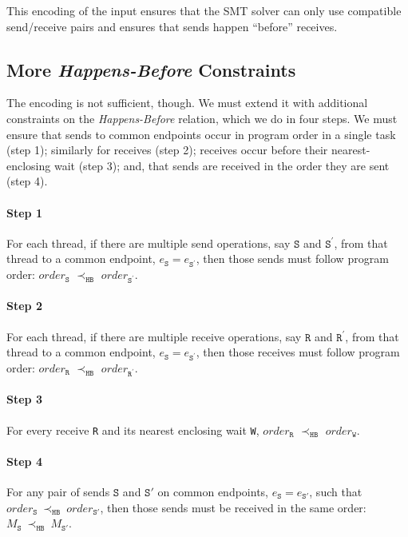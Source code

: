 This encoding of the input ensures that the SMT solver can only use
compatible send/receive pairs and ensures that sends happen ``before''
receives.

\subsection{More \emph{Happens-Before} Constraints}

The encoding is not sufficient, though. We must extend it with
additional constraints on the \emph{Happens-Before} relation, which we
do in four steps. We must ensure that sends to common endpoints occur
in program order in a single task (step 1); similarly for receives
(step 2); receives occur before their nearest-enclosing wait (step 3);
and, that sends are received in the order they are sent (step 4).

\paragraph*{Step 1} For each thread, if there are multiple send
operations, say $\mathtt{S}$ and $\mathtt{S^\prime}$, from that thread
to a common endpoint, $e_\mathtt{S} = e_\mathtt{S^\prime}$, then those
sends must follow program order: $\mathit{order}_\mathtt{S}$
$\prec_\mathtt{HB}$ $\mathit{order}_\mathtt{S^\prime}$.

\paragraph*{Step 2} For each thread, if there are multiple receive
operations, say $\mathtt{R}$ and $\mathtt{R^\prime}$, from that thread
to a common endpoint, $e_\mathtt{S} = e_\mathtt{S^\prime}$, then those
receives must follow program order: $\mathit{order}_\mathtt{R}$
$\prec_\mathtt{HB}$ $\mathit{order}_\mathtt{R^\prime}$.

\paragraph*{Step 3} For every receive \texttt{R} and its nearest
enclosing wait \texttt{W}, $\mathit{order}_\mathtt{R}$
$\prec_\mathtt{HB}$ $\mathit{order}_\mathtt{W}$.

\paragraph*{Step 4} For any pair of sends $\mathtt{S}$ and
$\mathtt{S'}$ on common endpoints, $e_{\mathtt{S}}=e_{\mathtt{S'}}$,
such that
$\mathit{order}_\mathtt{S}\ \mathrm{\prec_\mathtt{HB}}\ \mathit{order}_\mathtt{S'}$,
then those sends must be received in the same order:
$M_{\mathtt{S}}\ \mathrm{\prec_{\mathtt{HB}}}\ M_{\mathtt{S'}}$.

